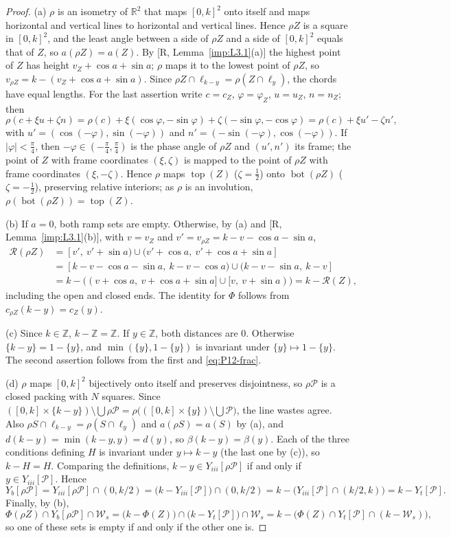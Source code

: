 \documentclass[11pt]{amsart}
\newcommand{\R}{\mathbb R}
\newcommand{\Z}{\mathbb Z}
\newcommand{\cP}{\mathcal P}
\newcommand{\cR}{\mathcal R}
\newcommand{\Bot}{\operatorname{bot}}
\newcommand{\Top}{\operatorname{top}}
\newcommand{\frc}[1]{\{#1\}}
\theoremstyle{definition}
\theoremstyle{remark}
\numberwithin{equation}{section}
\begin{document}
\begin{proof}
(a) $\rho$ is an isometry of $\R^2$ that maps $[0,k]^2$ onto itself and maps horizontal and vertical lines to horizontal and vertical lines. Hence $\rho Z$ is a square in $[0,k]^2$, and the least angle between a side of $\rho Z$ and a side of $[0,k]^2$ equals that of $Z$, so $a(\rho Z)=a(Z)$. By [R, Lemma~\ref{imp:L3.1}(a)] the highest point of $Z$ has height $v_Z+\cos a+\sin a$; $\rho$ maps it to the lowest point of $\rho Z$, so $v_{\rho Z}=k-(v_Z+\cos a+\sin a)$. Since $\rho Z\cap\ell_{k-y}=\rho(Z\cap\ell_y)$, the chords have equal lengths. For the last assertion write $c=c_Z$, $\varphi=\varphi_Z$, $u=u_Z$, $n=n_Z$; then
\[
\rho(c+\xi u+\zeta n)=\rho(c)+\xi(\cos\varphi,-\sin\varphi)+\zeta(-\sin\varphi,-\cos\varphi)=\rho(c)+\xi u'-\zeta n',
\]
with $u'=(\cos(-\varphi),\sin(-\varphi))$ and $n'=(-\sin(-\varphi),\cos(-\varphi))$. If $|\varphi|<\frac\pi4$, then $-\varphi\in(-\frac\pi4,\frac\pi4)$ is the phase angle of $\rho Z$ and $(u',n')$ its frame; the point of $Z$ with frame coordinates $(\xi,\zeta)$ is mapped to the point of $\rho Z$ with frame coordinates $(\xi,-\zeta)$. Hence $\rho$ maps $\Top(Z)$ ($\zeta=\frac12$) onto $\Bot(\rho Z)$ ($\zeta=-\frac12$), preserving relative interiors; as $\rho$ is an involution, $\rho(\Bot(\rho Z))=\Top(Z)$.

(b) If $a=0$, both ramp sets are empty. Otherwise, by (a) and [R, Lemma~\ref{imp:L3.1}(b)], with $v=v_Z$ and $v'=v_{\rho Z}=k-v-\cos a-\sin a$,
\begin{align*}
\cR(\rho Z)&=[v',\ v'+\sin a)\cup(v'+\cos a,\ v'+\cos a+\sin a]\\
&=[k-v-\cos a-\sin a,\ k-v-\cos a)\cup(k-v-\sin a,\ k-v]\\
&=k-\bigl((v+\cos a,\ v+\cos a+\sin a]\cup[v,\ v+\sin a)\bigr)=k-\cR(Z),
\end{align*}
including the open and closed ends. The identity for $\Phi$ follows from $c_{\rho Z}(k-y)=c_Z(y)$.

(c) Since $k\in\Z$, $k-\Z=\Z$. If $y\in\Z$, both distances are $0$. Otherwise $\frc{k-y}=1-\frc{y}$, and $\min(\frc y,1-\frc y)$ is invariant under $\frc y\mapsto1-\frc y$. The second assertion follows from the first and \eqref{eq:P12-frac}.

(d) $\rho$ maps $[0,k]^2$ bijectively onto itself and preserves disjointness, so $\rho\cP$ is a closed packing with $N$ squares. Since $([0,k]\times\{k-y\})\setminus\bigcup\rho\cP=\rho\bigl(([0,k]\times\{y\})\setminus\bigcup\cP\bigr)$, the line wastes agree. Also $\rho S\cap\ell_{k-y}=\rho(S\cap\ell_y)$ and $a(\rho S)=a(S)$ by (a), and $d(k-y)=\min(k-y,y)=d(y)$, so $\beta(k-y)=\beta(y)$. Each of the three conditions defining $H$ is invariant under $y\mapsto k-y$ (the last one by (c)), so $k-H=H$. Comparing the definitions, $k-y\in Y_{iii}[\rho\cP]$ if and only if $y\in Y_{iii}[\cP]$. Hence
\[
Y_b[\rho\cP]=Y_{iii}[\rho\cP]\cap(0,k/2)=\bigl(k-Y_{iii}[\cP]\bigr)\cap(0,k/2)=k-\bigl(Y_{iii}[\cP]\cap(k/2,k)\bigr)=k-Y_t[\cP].
\]
Finally, by (b),
\[
\Phi(\rho Z)\cap Y_b[\rho\cP]\cap\mathcal W_s=\bigl(k-\Phi(Z)\bigr)\cap\bigl(k-Y_t[\cP]\bigr)\cap\mathcal W_s=k-\bigl(\Phi(Z)\cap Y_t[\cP]\cap(k-\mathcal W_s)\bigr),
\]
so one of these sets is empty if and only if the other one is.
\end{proof}
\end{document}

